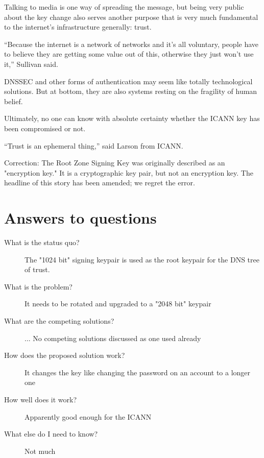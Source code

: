 \documentclass{article}
\begin{document}
Talking to media is one way of spreading the message, but being very public
about the key change also serves another purpose that is very much fundamental
to the internet’s infrastructure generally: trust.

“Because the internet is a network of networks and it's all voluntary, people
have to believe they are getting some value out of this, otherwise they just
won't use it,” Sullivan said.

DNSSEC and other forms of authentication may seem like totally technological
solutions. But at bottom, they are also systems resting on the fragility of
human belief.

Ultimately, no one can know with absolute certainty whether the ICANN key has
been compromised or not.

“Trust is an ephemeral thing,” said Larson from ICANN.

Correction: The Root Zone Signing Key was originally described as an
"encryption key." It is a cryptographic key pair, but not an encryption key.
The headline of this story has been amended; we regret the error.

\section {Answers to questions}
\begin{description}
    \item[What is the status quo?] {
            The "1024 bit" signing keypair is used as the root keypair for the DNS tree of trust.
        }
    \item[What is the problem?] {
            It needs to be rotated and upgraded to a "2048 bit" keypair
        }
    \item[What are the competing solutions?] {
            ... No competing solutions discussed as one used already
        }
    \item[How does the proposed solution work?] {
            It changes the key like changing the password on an account to a longer one
        }
    \item[How well does it work?] {
            Apparently good enough for the ICANN
        }
    \item[What else do I need to know?] {
            Not much
        }
\end{description}
\end{document}
